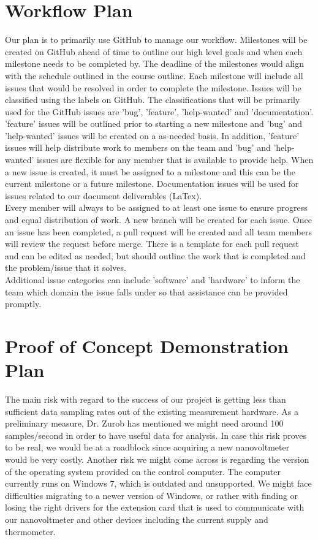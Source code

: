 \documentclass{article}
\begin{document}
\section{Workflow Plan}

\noindent Our plan is to primarily use GitHub to manage our workflow. 
Milestones will be created on GitHub ahead of time to outline our high level goals and when each milestone needs to be completed by.
The deadline of the milestones would align with the schedule outlined in the course outline.
Each milestone will include all issues that would be resolved in order to complete the milestone. 
Issues will be classified using the labels on GitHub. The classifications that will be primarily used for the 
GitHub issues are 'bug', 'feature', 'help-wanted' and 'documentation'. 'feature' issues will be outlined prior to starting a 
new milestone and 'bug' and 'help-wanted' issues will be created on a as-needed basis. In addition, 'feature' issues will help distribute work to 
members on the team and 'bug' and 'help-wanted' issues are flexible for any member that is available to provide help. 
When a new issue is created, it must be assigned to a milestone and this can be the current milestone or a future milestone.
Documentation issues will be used for issues related to our document deliverables (LaTex). \\

\noindent Every member will always to be assigned to at least one issue to ensure progress and equal distribution of work.
A new branch will be created for each issue. Once an issue has been completed, 
a pull request will be created and all team members will review the request before merge. 
There is a template for each pull request and can be edited as needed, but should outline the work that is completed
and the problem/issue that it solves. \\

\noindent Additional issue categories can include 'software' and 'hardware' to inform the team which domain the issue falls under so 
that assistance can be provided promptly.

\section{Proof of Concept Demonstration Plan}

\noindent The main risk with regard to the success of our project is getting less than sufficient data sampling rates out of the existing measurement hardware. As a preliminary measure, Dr. Zurob has mentioned we might need around 100 samples/second in order to have useful data for analysis. In case this risk proves to be real, we would be at a roadblock since acquiring a new nanovoltmeter would be very costly.
\noindent Another risk we might come across is regarding the version of the operating system provided on the control computer. The computer currently runs on Windows 7, which is outdated and unsupported. We might face difficulties migrating to a newer version of Windows, or rather with finding or losing the right drivers for the extension card that is used to communicate with our nanovoltmeter and other devices including the current supply and thermometer. \\
\end{document}
